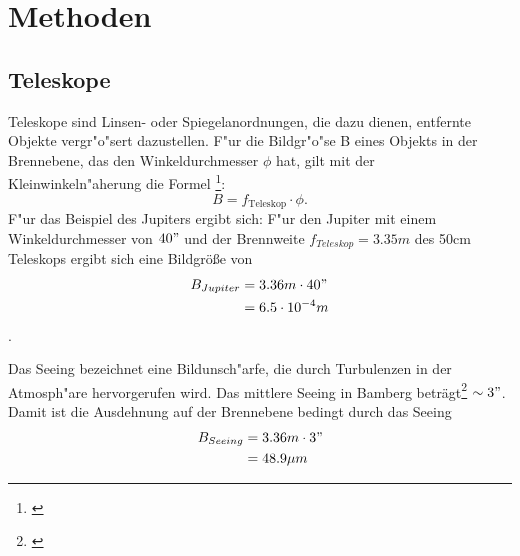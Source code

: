 \section{Methoden}
\subsection{Teleskope}
Teleskope sind Linsen- oder Spiegelanordnungen, die dazu dienen, entfernte Objekte vergr"o"sert dazustellen. F"ur die Bildgr"o"se B eines Objekts in der Brennebene, das den Winkeldurchmesser $\phi$ hat, gilt mit der Kleinwinkeln"aherung die Formel \footnote{\cite{astr}}:
\begin{equation}
B = f_{\mathrm{Teleskop}} \cdot \phi.
\end{equation}
F"ur das Beispiel des Jupiters ergibt sich: 
F"ur den Jupiter mit einem Winkeldurchmesser von $40"$ und der Brennweite $f_{Teleskop}=3.35m$ des 50cm Teleskops ergibt sich eine Bildgröße von
\begin{align*}
B_{Jupiter}&=3.36m \cdot 40"\\
&= 6.5 \cdot 10^{-4} m
\end{align*}.

Das Seeing bezeichnet eine Bildunsch"arfe, die durch Turbulenzen in der Atmosph"are hervorgerufen wird. 
Das mittlere Seeing in Bamberg beträgt\footnote{\cite{astr}} $\sim3 "$.
Damit ist die Ausdehnung auf der Brennebene bedingt durch das Seeing
\begin{align*}
B_{Seeing}&=3.36m \cdot 3"\\
&= 48.9 \mu m
\end{align*}


